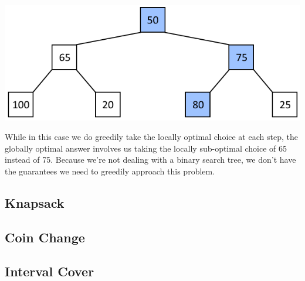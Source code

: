 {\centering \includegraphics{images/greedy/greedy_tree_2.png}}

While in this case we do greedily take the locally optimal choice at each step, the globally optimal answer involves us taking the locally sub-optimal choice of 65 instead of 75. Because we're not dealing with a binary search tree, we don't have the guarantees we need to greedily approach this problem.

\subsection{Knapsack}

\subsection{Coin Change}

\subsection{Interval Cover}